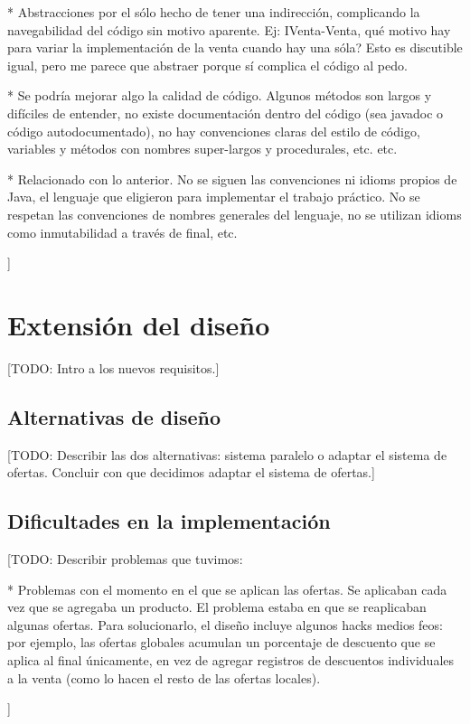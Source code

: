 \documentclass[a4paper,11pt]{article}
\begin{document}
  * Abstracciones por el sólo hecho de tener una indirección, complicando la
  navegabilidad del código sin motivo aparente. Ej: IVenta-Venta, qué motivo
  hay para variar la implementación de la venta cuando hay una sóla? Esto es
  discutible igual, pero me parece que abstraer porque sí complica el código al
  pedo.

  * Se podría mejorar algo la calidad de código. Algunos métodos son largos y
  difíciles de entender, no existe documentación dentro del código (sea javadoc
  o código autodocumentado), no hay convenciones claras del estilo de código,
  variables y métodos con nombres super-largos y procedurales, etc.  etc.

  * Relacionado con lo anterior. No se siguen las convenciones ni idioms
  propios de Java, el lenguaje que eligieron para implementar el trabajo
  práctico. No se respetan las convenciones de nombres generales del lenguaje,
  no se utilizan idioms como inmutabilidad a través de final, etc.

]

\section{Extensión del diseño}

[TODO: Intro a los nuevos requisitos.]

\subsection{Alternativas de diseño}

[TODO: Describir las dos alternativas: sistema paralelo o adaptar el sistema de
ofertas. Concluir con que decidimos adaptar el sistema de ofertas.]

\subsection{Dificultades en la implementación}

[TODO: Describir problemas que tuvimos:

  * Problemas con el momento en el que se aplican las ofertas. Se aplicaban
  cada vez que se agregaba un producto. El problema estaba en que se
  reaplicaban algunas ofertas. Para solucionarlo, el diseño incluye algunos
  hacks medios feos: por ejemplo, las ofertas globales acumulan un porcentaje
  de descuento que se aplica al final únicamente, en vez de agregar registros
  de descuentos individuales a la venta (como lo hacen el resto de las ofertas
  locales).

]
\end{document}
